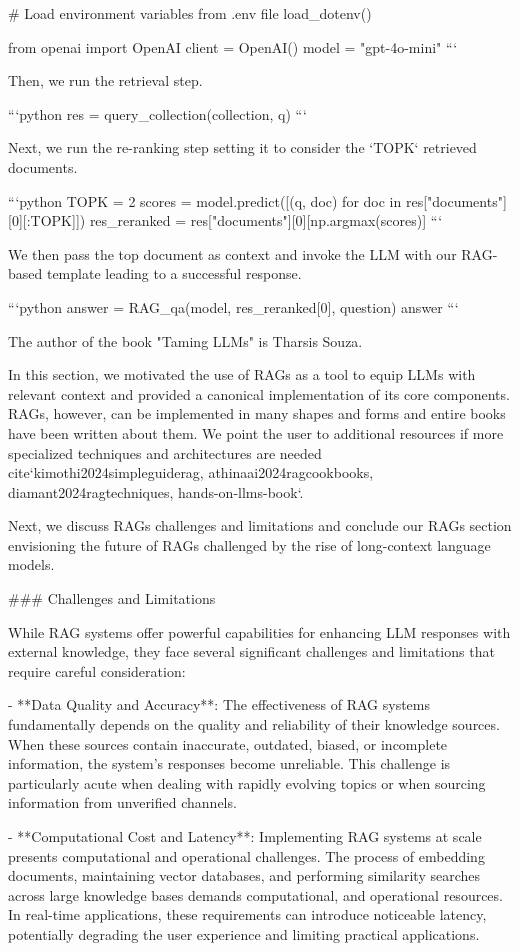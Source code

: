 {{# Load environment variables from .env file
load_dotenv()

from openai import OpenAI
client = OpenAI()
model = "gpt-4o-mini"
```

Then, we run the retrieval step.


```python
res = query_collection(collection, q)
```

Next, we run the re-ranking step setting it to consider the `TOPK` retrieved documents.


```python
TOPK = 2
scores = model.predict([(q, doc) for doc in res["documents"][0][:TOPK]])
res_reranked = res["documents"][0][np.argmax(scores)]
```

We then pass the top document as context and invoke the LLM with our RAG-based template leading to a successful response.


```python
answer = RAG_qa(model, res_reranked[0], question)
answer
```

    The author of the book "Taming LLMs" is Tharsis Souza.


In this section, we motivated the use of RAGs as a tool to equip LLMs with relevant context and provided a canonical implementation of its core components. RAGs, however, can be implemented in many shapes and forms and entire books have been written about them. We point the user to additional resources if more specialized techniques and architectures are needed {cite}`kimothi2024simpleguiderag, athinaai2024ragcookbooks, diamant2024ragtechniques, hands-on-llms-book`.

Next, we discuss RAGs challenges and limitations and conclude our RAGs section envisioning the future of RAGs challenged by the rise of long-context language models.

### Challenges and Limitations

While RAG systems offer powerful capabilities for enhancing LLM responses with external knowledge, they face several significant challenges and limitations that require careful consideration:
 
- **Data Quality and Accuracy**: The effectiveness of RAG systems fundamentally depends on the quality and reliability of their knowledge sources. When these sources contain inaccurate, outdated, biased, or incomplete information, the system's responses become unreliable. This challenge is particularly acute when dealing with rapidly evolving topics or when sourcing information from unverified channels.
 
- **Computational Cost and Latency**: Implementing RAG systems at scale presents computational and operational challenges. The process of embedding documents, maintaining vector databases, and performing similarity searches across large knowledge bases demands computational, and operational resources. In real-time applications, these requirements can introduce noticeable latency, potentially degrading the user experience and limiting practical applications.
 
}}
